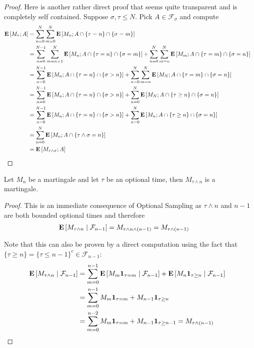 \begin{proof}
Here is another rather direct proof that seems quite transparent and
is completely self contained.
Suppose $\sigma, \tau \leq N$.  Pick $A \in \mathcal{F}_\sigma$ and
compute
\begin{align*}
\expectation{M_\tau ; A} &= \sum_{n=0}^N \sum_{m=0}^N \expectation{M_n
  ; A \cap \lbrace \tau = n \rbrace \cap \lbrace \sigma = m\rbrace} \\
&=\sum_{n=0}^{N-1} \sum_{m=n+1}^N \expectation{M_n
  ; A \cap \lbrace \tau = n \rbrace \cap \lbrace \sigma = m\rbrace} + \sum_{n=0}^{N} \sum_{m=n}^N \expectation{M_m
  ; A \cap \lbrace \tau = m \rbrace \cap \lbrace \sigma = n\rbrace}\\
&=\sum_{n=0}^{N-1} \expectation{M_n
  ; A \cap \lbrace \tau = n \rbrace \cap \lbrace \sigma > n\rbrace} + \sum_{n=0}^{N} \sum_{m=n}^N \expectation{M_N
  ; A \cap \lbrace \tau = m \rbrace \cap \lbrace \sigma = n\rbrace}\\
&=\sum_{n=0}^{N-1} \expectation{M_n ; A \cap \lbrace \tau = n \rbrace
  \cap \lbrace \sigma > n\rbrace} + 
\sum_{n=0}^{N} \expectation{M_N  ; A \cap \lbrace \tau \geq n \rbrace \cap \lbrace \sigma = n\rbrace}\\
&=\sum_{n=0}^{N-1} \expectation{M_n ; A \cap \lbrace \tau = n \rbrace
  \cap \lbrace \sigma > n\rbrace} + 
\sum_{n=0}^{N} \expectation{M_n  ; A \cap \lbrace \tau \geq n \rbrace
  \cap \lbrace \sigma = n\rbrace}\\
&=\sum_{n=0}^{N} \expectation{M_n  ; A \cap \lbrace \tau \wedge \sigma = n \rbrace}\\
&=\expectation{M_{\tau \wedge \sigma} ; A}
\end{align*}
\end{proof}

\begin{cor}Let $M_n$ be a martingale and let $\tau$ be an optional
  time, then $M_{\tau \wedge n}$ is a martingale.
\end{cor}
\begin{proof}
This is an immediate consequence of Optional Sampling as $\tau \wedge
n$ and $n-1$ are both bounded optional times and therefore 
\begin{align*}
\cexpectationlong{\mathcal{F}_{n-1}}{M_{\tau \wedge n}} &= M_{\tau
  \wedge n \wedge (n-1)} = M_{\tau \wedge (n-1)}
\end{align*}

Note that this can also be proven by a direct computation using the
fact that $\lbrace \tau \geq n \rbrace = \lbrace \tau \leq n-1
\rbrace^c \in \mathcal{F}_{n-1}$:
\begin{align*}
\cexpectationlong{\mathcal{F}_{n-1}}{M_{\tau \wedge n}} &=
\sum_{m=0}^{n-1} \cexpectationlong{\mathcal{F}_{n-1}}{M_m
  \characteristic{\tau=m}} + \cexpectationlong{\mathcal{F}_{n-1}}{M_n
\characteristic{\tau \geq n}} \\
&= \sum_{m=0}^{n-1} M_m  \characteristic{\tau=m} + M_{n-1}
\characteristic{\tau \geq n} \\
&= \sum_{m=0}^{n-2} M_m  \characteristic{\tau=m} + M_{n-1}
\characteristic{\tau \geq n-1} = M_{\tau \wedge (n-1)}\\
\end{align*}
\end{proof}


